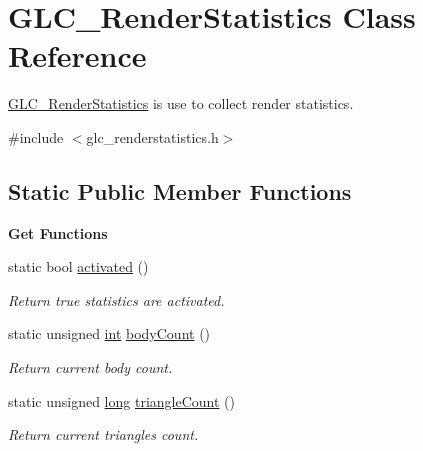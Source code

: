 \hypertarget{class_g_l_c___render_statistics}{\section{G\-L\-C\-\_\-\-Render\-Statistics Class Reference}
\label{class_g_l_c___render_statistics}
}


\hyperlink{class_g_l_c___render_statistics}{G\-L\-C\-\_\-\-Render\-Statistics} is use to collect render statistics.  




{\ttfamily \#include $<$glc\-\_\-renderstatistics.\-h$>$}

\subsection*{Static Public Member Functions}
\begin{Indent}{\bf Get Functions}\par
\begin{DoxyCompactItemize}
\item 
static bool \hyperlink{class_g_l_c___render_statistics_a34dd5c8cb52c35b0a1f15a560e2b52f6}{activated} ()
\begin{DoxyCompactList}\small\item\em Return true statistics are activated. \end{DoxyCompactList}\item 
static unsigned \hyperlink{ioapi_8h_a787fa3cf048117ba7123753c1e74fcd6}{int} \hyperlink{class_g_l_c___render_statistics_aed14f2a0ae5baaa87b76546235f2f896}{body\-Count} ()
\begin{DoxyCompactList}\small\item\em Return current body count. \end{DoxyCompactList}\item 
static unsigned \hyperlink{ioapi_8h_a3c7b35ad9dab18b8310343c201f7b27e}{long} \hyperlink{class_g_l_c___render_statistics_ae61c017bb181b5f57dbaa6ca88b57b58}{triangle\-Count} ()
\begin{DoxyCompactList}\small\item\em Return current triangles count. \end{DoxyCompactList}\end{DoxyCompactItemize}
\end{Indent}
